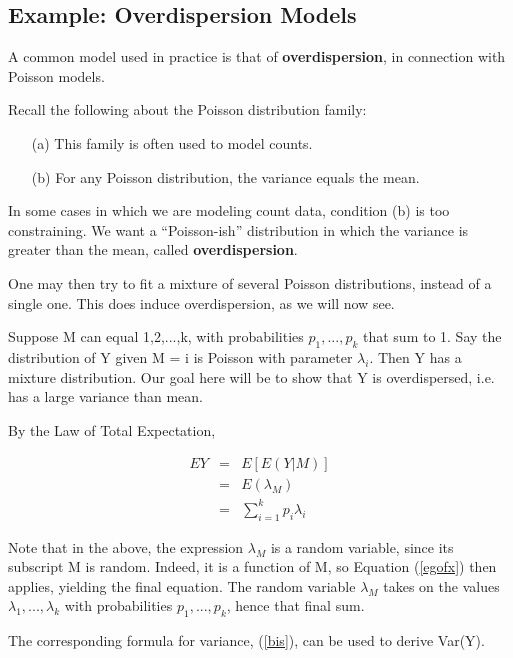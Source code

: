\documentclass[11pt]{article}
\begin{document}
\subsection{Example:  Overdispersion Models}

A common model used in practice is that of {\bf overdispersion}, in
connection with Poisson models.  

Recall the following about the Poisson distribution family:

\begin{itemize}

\item [(a)] This family is often used to model counts.

\item [(b)] For any Poisson distribution, the variance equals the mean.

\end{itemize}

In some cases in which we are modeling count data, condition (b) is too
constraining.  We want a ``Poisson-ish''
distribution in which the variance is greater
than the mean, called {\bf overdispersion}.  

One may then try to fit a mixture of several Poisson distributions,
instead of a single one.  This does induce overdispersion, as we will
now see.  

Suppose M can equal 1,2,...,k, with probabilities $p_1,...,p_k$ that sum
to 1.  Say the distribution of Y given M = i is Poisson with parameter
$\lambda_i$.  Then Y has a mixture distribution.  Our goal here will be
to show that Y is overdispersed, i.e. has a large variance than mean.

By the Law of Total Expectation,

\begin{eqnarray}
\label{meanlamb}
EY &=& E[E(Y|M)] \\ 
&=& E(\lambda_M) \label{elambm} \\
&=& \sum_{i=1}^k p_i \lambda_i
\end{eqnarray}

Note that in the above, the expression $\lambda_M$ is a random variable,
since its subscript M is random.  Indeed, it is a function of M, so
Equation (\ref{egofx}) then applies, yielding the final equation.  The
random variable $\lambda_M$ takes on the values $\lambda_1,...,\lambda_k$
with probabilities $p_1,...,p_k$, hence that final sum.

The corresponding formula for variance, (\ref{bis}), can be used to
derive Var(Y).
\end{document}
